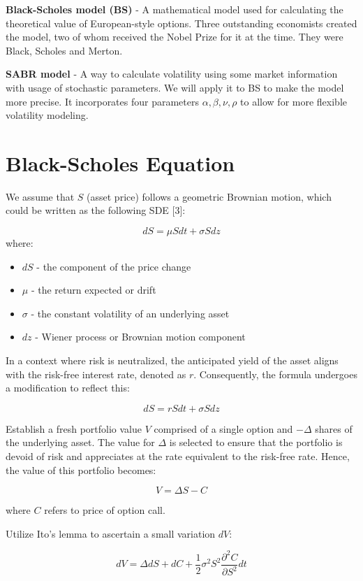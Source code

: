 \documentclass[a4paper,fleqn,12pt]{extarticle}
\begin{document}
	\textbf{Black-Scholes model (BS)} - A mathematical model used for calculating the theoretical value of European-style options. Three outstanding economists created the model, two of whom received the Nobel Prize for it at the time. They were Black, Scholes and Merton.

	\textbf{SABR model} - A way to calculate volatility using some market information with usage of stochastic parameters. We will apply it to BS to make the model more precise. It incorporates four parameters $\alpha, \beta, \nu, \rho$ to allow for more flexible volatility modeling.
	
	\newpage
	\section{Black-Scholes Equation}

	We assume that \( S \) (asset price) follows a geometric Brownian motion, which could be written as the following SDE [3]:

	\[
	dS = \mu S dt + \sigma S dz
	\]
	where:
	\begin{itemize}
		\item \( dS \) - the component of the price change
		\item \( \mu \) - the return expected or drift
		\item \( \sigma \) - the constant volatility of an underlying asset
		\item \( dz \) - Wiener process or Brownian motion component
	\end{itemize}

	In a context where risk is neutralized, the anticipated yield of the asset aligns with the risk-free interest rate, denoted as $r$. Consequently, the formula undergoes a modification to reflect this:

	\[
	dS = r S dt + \sigma S dz
	\]

	Establish a fresh portfolio value $V$ comprised of a single option and $-\Delta$ shares of the underlying asset. The value for $\Delta$ is selected to ensure that the portfolio is devoid of risk and appreciates at the rate equivalent to the risk-free rate. Hence, the value of this portfolio becomes:

	\[
	V = \Delta S - C
	\]

	where \( C \) refers to price of option call.

	Utilize Ito's lemma to ascertain a small variation $dV$:

	\[
	dV = \Delta dS + dC + \frac{1}{2} \sigma^2 S^2 \frac{\partial^2 C}{\partial S^2} dt
	\]
\end{document}
